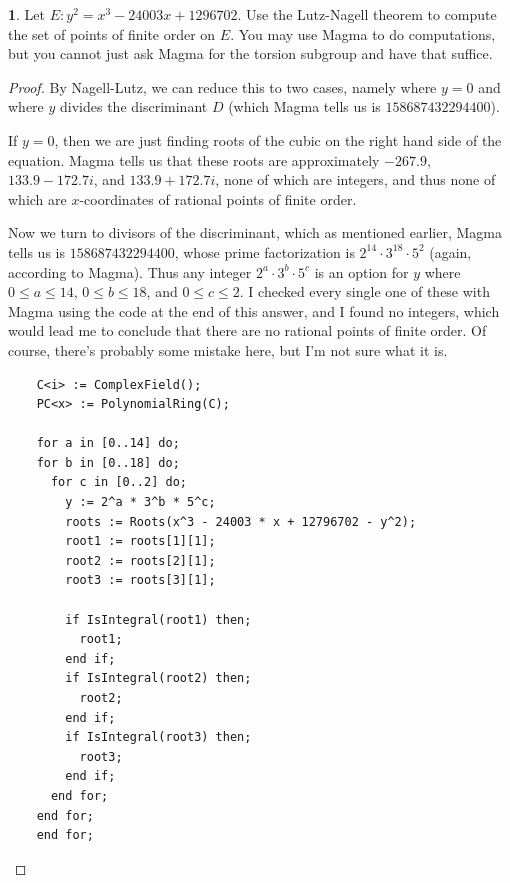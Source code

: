 \documentclass[12pt]{article}
\theoremstyle{definition}
\newtheorem{ex}{}
\begin{document}
\begin{ex}
	Let $E : y^{2} = x^{3} - 24003x + 1296702$.
	Use the Lutz-Nagell theorem to compute the set of points of finite order on $E$.
	You may use Magma to do computations, but you cannot just ask Magma for the torsion subgroup and have that suffice.
\end{ex}
\begin{proof}
	By Nagell-Lutz, we can reduce this to two cases, namely where $y = 0$ and where $y$ divides the discriminant $D$ (which Magma tells us is $158687432294400$).

	If $y = 0$, then we are just finding roots of the cubic on the right hand side of the equation.
	Magma tells us that these roots are approximately $-267.9$, $133.9 - 172.7i$, and $133.9 + 172.7i$, none of which are integers, and thus none of which are $x$-coordinates of rational points of finite order.

	Now we turn to divisors of the discriminant, which as mentioned earlier, Magma tells us is $158687432294400$, whose prime factorization is $2^{14} \cdot 3^{18} \cdot 5^2$ (again, according to Magma).
	Thus any integer $2^a \cdot 3^b \cdot 5^c$ is an option for $y$ where $0 \leq a \leq 14$, $0 \leq b \leq 18$, and $0 \leq c \leq 2$.
	I checked every single one of these with Magma using the code at the end of this answer, and I found no integers, which would lead me to conclude that there are no rational points of finite order.
	Of course, there's probably some mistake here, but I'm not sure what it is.

  \begin{verbatim}
	C<i> := ComplexField();
	PC<x> := PolynomialRing(C);

	for a in [0..14] do;
    for b in [0..18] do;
      for c in [0..2] do;
        y := 2^a * 3^b * 5^c;
        roots := Roots(x^3 - 24003 * x + 12796702 - y^2);
        root1 := roots[1][1];
        root2 := roots[2][1];
        root3 := roots[3][1];

        if IsIntegral(root1) then;
          root1;
        end if;
        if IsIntegral(root2) then;
          root2;
        end if;
        if IsIntegral(root3) then;
          root3;
        end if;
      end for;
    end for;
	end for;
  \end{verbatim}
\end{proof}
\end{document}
